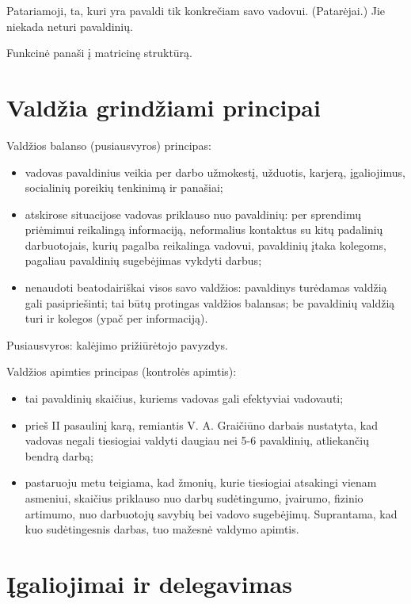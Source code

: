 Patariamoji, ta, kuri yra pavaldi tik konkrečiam savo vadovui. 
(Patarėjai.) Jie niekada neturi pavaldinių.

Funkcinė panaši į matricinę struktūrą.

\section{Valdžia grindžiami principai}

Valdžios balanso (pusiausvyros) principas:
\begin{itemize}
  \item vadovas pavaldinius veikia per darbo užmokestį, užduotis, karjerą,
    įgaliojimus, socialinių poreikių tenkinimą ir panašiai;
  \item atskirose situacijose vadovas priklauso nuo pavaldinių: per
    sprendimų priėmimui reikalingą informaciją, neformalius kontaktus
    su kitų padalinių darbuotojais, kurių pagalba reikalinga vadovui,
    pavaldinių įtaka kolegoms, pagaliau pavaldinių sugebėjimas vykdyti
    darbus;
  \item nenaudoti beatodairiškai visos savo valdžios: pavaldinys
    turėdamas valdžią gali pasipriešinti; tai būtų protingas valdžios
    balansas; be pavaldinių valdžią turi ir kolegos (ypač per informaciją).
\end{itemize}

Pusiausvyros: kalėjimo prižiūrėtojo pavyzdys.

Valdžios apimties principas (kontrolės apimtis):
\begin{itemize}
  \item tai pavaldinių skaičius, kuriems vadovas gali efektyviai vadovauti;
  \item prieš II pasaulinį karą, remiantis V. A. Graičiūno darbais
    nustatyta, kad vadovas negali tiesiogiai valdyti daugiau nei
    5-6 pavaldinių, atliekančių bendrą darbą;
  \item pastaruoju metu teigiama, kad žmonių, kurie tiesiogiai atsakingi
    vienam asmeniui, skaičius priklauso nuo darbų sudėtingumo, įvairumo,
    fizinio artimumo, nuo darbuotojų savybių bei vadovo sugebėjimų.
    Suprantama, kad kuo sudėtingesnis darbas, tuo mažesnė valdymo
    apimtis.
\end{itemize}

\section{Įgaliojimai ir delegavimas}

